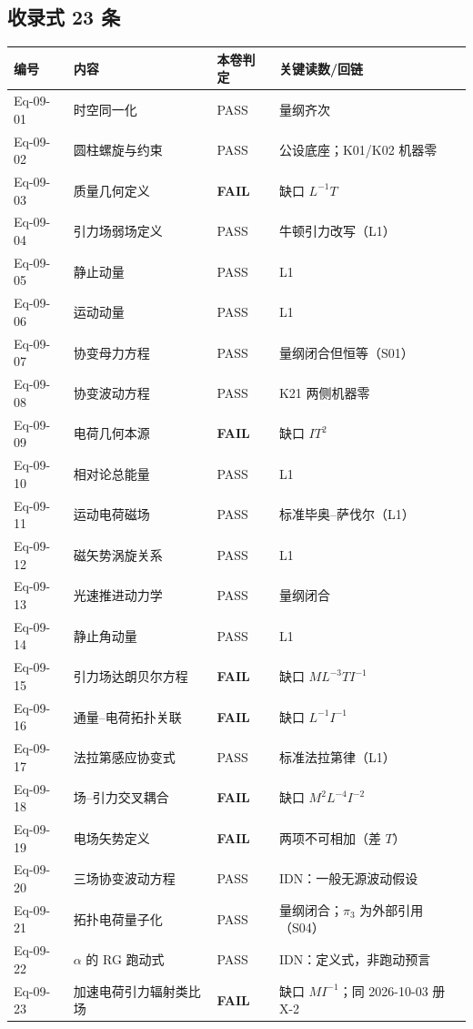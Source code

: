 \documentclass[UTF8,fontset=fandol,11pt]{ctexart}
\begin{document}
\subsection{收录式 23 条}
\begin{center}
\begin{tabular}{p{2.0cm}p{5.4cm}p{2.2cm}p{4.2cm}}
\toprule
编号 & 内容 & 本卷判定 & 关键读数/回链 \\
\midrule
Eq-09-01 & 时空同一化 & PASS & 量纲齐次 \\
Eq-09-02 & 圆柱螺旋与约束 & PASS & 公设底座；K01/K02 机器零 \\
Eq-09-03 & 质量几何定义 & \textbf{FAIL} & 缺口 $L^{-1}T$ \\
Eq-09-04 & 引力场弱场定义 & PASS & 牛顿引力改写（L1） \\
Eq-09-05 & 静止动量 & PASS & L1 \\
Eq-09-06 & 运动动量 & PASS & L1 \\
Eq-09-07 & 协变母力方程 & PASS & 量纲闭合但恒等（S01） \\
Eq-09-08 & 协变波动方程 & PASS & K21 两侧机器零 \\
Eq-09-09 & 电荷几何本源 & \textbf{FAIL} & 缺口 $IT^2$ \\
Eq-09-10 & 相对论总能量 & PASS & L1 \\
Eq-09-11 & 运动电荷磁场 & PASS & 标准毕奥--萨伐尔（L1） \\
Eq-09-12 & 磁矢势涡旋关系 & PASS & L1 \\
Eq-09-13 & 光速推进动力学 & PASS & 量纲闭合 \\
Eq-09-14 & 静止角动量 & PASS & L1 \\
Eq-09-15 & 引力场达朗贝尔方程 & \textbf{FAIL} & 缺口 $ML^{-3}TI^{-1}$ \\
Eq-09-16 & 通量--电荷拓扑关联 & \textbf{FAIL} & 缺口 $L^{-1}I^{-1}$ \\
Eq-09-17 & 法拉第感应协变式 & PASS & 标准法拉第律（L1） \\
Eq-09-18 & 场--引力交叉耦合 & \textbf{FAIL} & 缺口 $M^2L^{-4}I^{-2}$ \\
Eq-09-19 & 电场矢势定义 & \textbf{FAIL} & 两项不可相加（差 $T$） \\
Eq-09-20 & 三场协变波动方程 & PASS & IDN：一般无源波动假设 \\
Eq-09-21 & 拓扑电荷量子化 & PASS & 量纲闭合；$\pi_3$ 为外部引用（S04） \\
Eq-09-22 & $\alpha$ 的 RG 跑动式 & PASS & IDN：定义式，非跑动预言 \\
Eq-09-23 & 加速电荷引力辐射类比场 & \textbf{FAIL} & 缺口 $MI^{-1}$；同 2026-10-03 册 X-2 \\
\bottomrule
\end{tabular}
\end{center}
\end{document}
